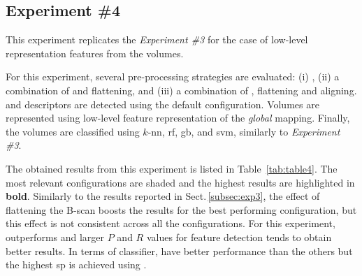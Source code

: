 \subsection{Experiment \#4}\label{subsec:exp4}
%
%
%
%

This experiment replicates the \emph{Experiment \#3} for the case of low-level representation features from the volumes.

For this experiment, several pre-processing strategies are evaluated: (i) \nlm, (ii) a combination of \nlm and flattening, and (iii) a combination of \nlm, flattening and aligning.
\lbp and \lbptop descriptors are detected using the default configuration.
Volumes are represented using low-level feature representation of the \emph{global} mapping.
Finally, the volumes are classified using $k$-\ac{nn}, \ac{rf}, \ac{gb}, and \ac{svm}, similarly to \emph{Experiment \#3}.

The obtained results from this experiment is listed in Table~\ref{tab:table4}.
The most relevant configurations are shaded and the highest results are highlighted in \textbf{bold}.
Similarly to the results reported in Sect.\,\ref{subsec:exp3}, the effect of flattening the B-scan boosts the results for the best performing configuration, but this effect is not consistent across all the configurations.
For this experiment, \lbptop outperforms \lbp and larger $P$ and $R$ values for feature detection tends to obtain better results. 
In terms of classifier, \rf have better performance than the others but the highest \ac{sp} is achieved using \svm.




